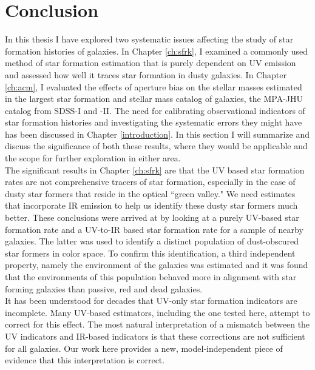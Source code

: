 \chapter{Conclusion}
\label{conclusion}

In this thesis I have explored two systematic issues affecting the study of star formation histories of galaxies. In Chapter \ref{ch:sfrk}, I examined a commonly used method of star formation estimation that is purely dependent on UV emission and assessed how well it traces star formation in dusty galaxies. In Chapter \ref{ch:acm}, I evaluated the effects of aperture bias on the stellar masses estimated in the largest star formation and stellar mass catalog of galaxies, the MPA-JHU catalog from SDSS-I and -II. The need for calibrating observational indicators of star formation histories and investigating the systematic errors they might have has been discussed in Chapter \ref{introduction}. In this section I will summarize and discuss the significance of both these results, where they would be applicable and the scope for further exploration in either area.\\

The significant results in Chapter \ref{ch:sfrk} are that the UV based star formation rates are not comprehensive tracers of star formation, especially in the case of dusty star formers that reside in the optical ``green valley." We need estimates that incorporate IR emission to help us identify these dusty star formers much better. These conclusions were arrived at by looking at a purely UV-based star formation rate and a UV-to-IR based star formation rate for a sample of nearby galaxies. The latter was used to identify a distinct population of dust-obscured star formers in color space. To confirm this identification, a third independent property, namely the environment of the galaxies was estimated and it was found that the environments of this population behaved more in alignment with star forming galaxies than passive, red and dead galaxies.\\

It has been understood for decades that UV-only star formation
indicators are incomplete. Many UV-based estimators, including
the one tested here, attempt to correct for this effect. 
The most natural interpretation of a mismatch between
the UV indicators and IR-based indicators is that these 
corrections are not sufficient for all galaxies. Our work
here provides a new, model-independent piece of evidence 
that this interpretation is correct.


